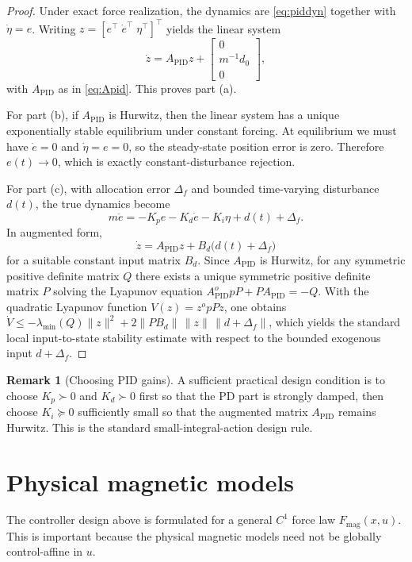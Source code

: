 \documentclass[11pt]{article}
\theoremstyle{definition}
\newtheorem{remark}{Remark}
\begin{document}
\begin{proof}
Under exact force realization, the dynamics are \eqref{eq:piddyn} together with $\dot \eta = e$. Writing $z = [e^\top\; \dot e^\top\; \eta^\top]^\top$ yields the linear system
\[
\dot z = A_{\mathrm{PID}} z + \begin{bmatrix} 0 \\ m^{-1}d_0 \\ 0 \end{bmatrix},
\]
with $A_{\mathrm{PID}}$ as in \eqref{eq:Apid}. This proves part (a).

For part (b), if $A_{\mathrm{PID}}$ is Hurwitz, then the linear system has a unique exponentially stable equilibrium under constant forcing. At equilibrium we must have $\dot e = 0$ and $\dot \eta = e = 0$, so the steady-state position error is zero. Therefore $e(t) \to 0$, which is exactly constant-disturbance rejection.

For part (c), with allocation error $\Delta_f$ and bounded time-varying disturbance $d(t)$, the true dynamics become
\[
 m\ddot e = -K_p e - K_d \dot e - K_i \eta + d(t) + \Delta_f.
\]
In augmented form,
\[
\dot z = A_{\mathrm{PID}} z + B_d\bigl(d(t)+\Delta_f\bigr)
\]
for a suitable constant input matrix $B_d$. Since $A_{\mathrm{PID}}$ is Hurwitz, for any symmetric positive definite matrix $Q$ there exists a unique symmetric positive definite matrix $P$ solving the Lyapunov equation $A_{\mathrm{PID}}^	op P + P A_{\mathrm{PID}} = -Q$. With the quadratic Lyapunov function $V(z)=z^	op P z$, one obtains $\dot V \le -\lambda_{\min}(Q)\|z\|^2 + 2\|P B_d\|\,\|z\|\,\|d+\Delta_f\|$, which yields the standard local input-to-state stability estimate with respect to the bounded exogenous input $d+\Delta_f$.
\end{proof}

\begin{remark}[Choosing PID gains]
A sufficient practical design condition is to choose $K_p \succ 0$ and $K_d \succ 0$ first so that the PD part is strongly damped, then choose $K_i \succeq 0$ sufficiently small so that the augmented matrix $A_{\mathrm{PID}}$ remains Hurwitz. This is the standard small-integral-action design rule.
\end{remark}

\section{Physical magnetic models}

The controller design above is formulated for a general $C^1$ force law $F_{\mathrm{mag}}(x,u)$. This is important because the physical magnetic models need not be globally control-affine in $u$.
\end{document}

